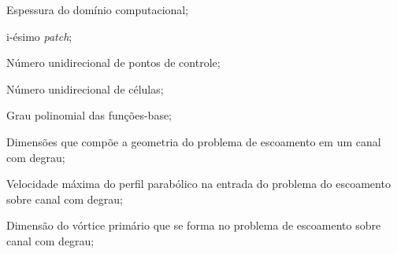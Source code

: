\begin{simbolos}
  \item[$e$] Espessura do domínio computacional;
  \item[$P_i$] i-ésimo \textit{patch};
  \item[$npc$] Número unidirecional de pontos de controle;
  \item[$ncel$] Número unidirecional de células;
  \item[$deg$] Grau polinomial das funções-base;
  \item[$h$, $s$, $x_e$, $x_f$, $x_{t}$] Dimensões que compõe a geometria do problema de escoamento em um canal com degrau;
  \item[$V_{max}$] Velocidade máxima do perfil parabólico na entrada do problema do escoamento sobre canal com degrau;
  \item[$x_{r}$] Dimensão do vórtice primário que se forma no problema de escoamento sobre canal com degrau;


\end{simbolos}
